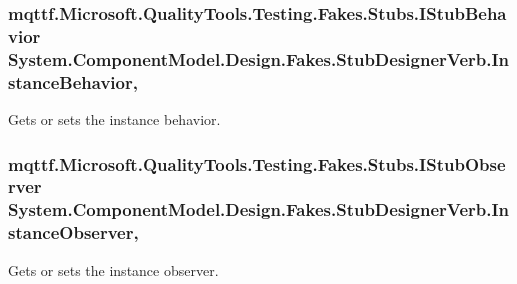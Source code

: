 \hypertarget{class_system_1_1_component_model_1_1_design_1_1_fakes_1_1_stub_designer_verb_a0ff008de9f14727a32f454c5b1a492fc}{
\subsubsection[{Instance\-Behavior}]{\setlength{\rightskip}{0pt plus 5cm}mqttf.\-Microsoft.\-Quality\-Tools.\-Testing.\-Fakes.\-Stubs.\-I\-Stub\-Behavior System.\-Component\-Model.\-Design.\-Fakes.\-Stub\-Designer\-Verb.\-Instance\-Behavior\hspace{0.3cm}{\ttfamily [get]}, {\ttfamily [set]}}}\label{class_system_1_1_component_model_1_1_design_1_1_fakes_1_1_stub_designer_verb_a0ff008de9f14727a32f454c5b1a492fc}


Gets or sets the instance behavior.

\hypertarget{class_system_1_1_component_model_1_1_design_1_1_fakes_1_1_stub_designer_verb_a3ad40852163e2e4d2d11cd1edfb53970}{
\subsubsection[{Instance\-Observer}]{\setlength{\rightskip}{0pt plus 5cm}mqttf.\-Microsoft.\-Quality\-Tools.\-Testing.\-Fakes.\-Stubs.\-I\-Stub\-Observer System.\-Component\-Model.\-Design.\-Fakes.\-Stub\-Designer\-Verb.\-Instance\-Observer\hspace{0.3cm}{\ttfamily [get]}, {\ttfamily [set]}}}\label{class_system_1_1_component_model_1_1_design_1_1_fakes_1_1_stub_designer_verb_a3ad40852163e2e4d2d11cd1edfb53970}


Gets or sets the instance observer.

